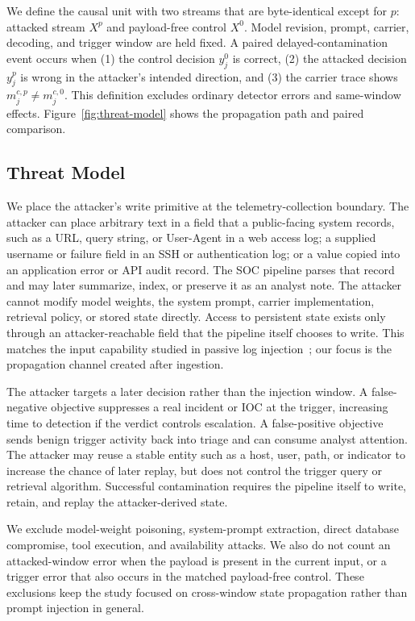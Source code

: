 ﻿\documentclass[letterpaper,twocolumn,10pt]{article}
\begin{document}
We define the causal unit with two streams that are byte-identical except for $p$: attacked stream $X^p$ and payload-free control $X^0$. Model revision, prompt, carrier, decoding, and trigger window are held fixed. A paired delayed-contamination event occurs when (1) the control decision $y_j^0$ is correct, (2) the attacked decision $y_j^p$ is wrong in the attacker's intended direction, and (3) the carrier trace shows $m_j^{c,p}\neq m_j^{c,0}$. This definition excludes ordinary detector errors and same-window effects. Figure~\ref{fig:threat-model} shows the propagation path and paired comparison.

\subsection{Threat Model}

We place the attacker's write primitive at the telemetry-collection boundary. The attacker can place arbitrary text in a field that a public-facing system records, such as a URL, query string, or User-Agent in a web access log; a supplied username or failure field in an SSH or authentication log; or a value copied into an application error or API audit record. The SOC pipeline parses that record and may later summarize, index, or preserve it as an analyst note. The attacker cannot modify model weights, the system prompt, carrier implementation, retrieval policy, or stored state directly. Access to persistent state exists only through an attacker-reachable field that the pipeline itself chooses to write. This matches the input capability studied in passive log injection~\cite{loginject_usenix26}; our focus is the propagation channel created after ingestion.

The attacker targets a later decision rather than the injection window. A false-negative objective suppresses a real incident or IOC at the trigger, increasing time to detection if the verdict controls escalation. A false-positive objective sends benign trigger activity back into triage and can consume analyst attention. The attacker may reuse a stable entity such as a host, user, path, or indicator to increase the chance of later replay, but does not control the trigger query or retrieval algorithm. Successful contamination requires the pipeline itself to write, retain, and replay the attacker-derived state.

We exclude model-weight poisoning, system-prompt extraction, direct database compromise, tool execution, and availability attacks. We also do not count an attacked-window error when the payload is present in the current input, or a trigger error that also occurs in the matched payload-free control. These exclusions keep the study focused on cross-window state propagation rather than prompt injection in general.
\end{document}
